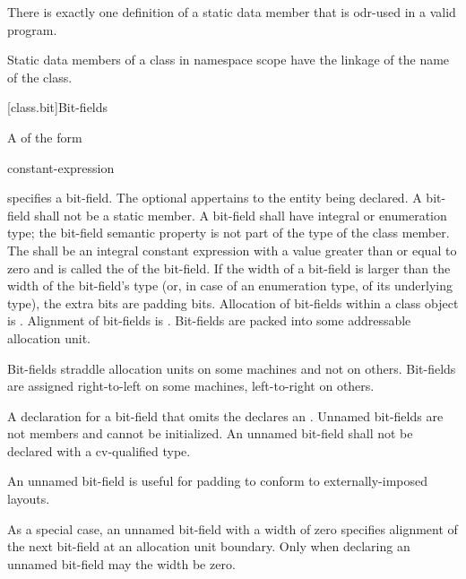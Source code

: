 \pnum
\begin{note}
There is exactly one definition of a static data member
that is odr-used in a valid program.
\end{note}

\pnum
\begin{note}
Static data members of a class in namespace scope have the linkage of the name of the class.
\end{note}

[class.bit]{Bit-fields}%

\pnum
A  of the form
\begin{ncsimplebnf}
  \terminal{:} constant-expression 
\end{ncsimplebnf}
%
%
specifies a bit-field.
The optional  appertains
to the entity being declared.
A bit-field shall not be a static member.
%
A bit-field shall have integral or enumeration type;
the bit-field semantic property is not part of the type of the class member.
The  shall be an integral constant expression
with a value greater than or equal to zero and
is called the  of the bit-field.
If the width of a bit-field is larger than
the width of the bit-field's type
(or, in case of an enumeration type, of its underlying type),
the extra bits are padding bits.
%
Allocation of bit-fields within a class object is
.
%
Alignment of bit-fields is .
%
Bit-fields are packed into some addressable allocation unit.
\begin{note}
Bit-fields straddle allocation units on some machines and not on others.
Bit-fields are assigned right-to-left on some machines, left-to-right on
others.
\end{note}

\pnum
A declaration for a bit-field that omits the 
declares an . Unnamed bit-fields are not
members and cannot be initialized.
An unnamed bit-field shall not be declared with a cv-qualified type.
\begin{note}
An unnamed bit-field is useful for padding to conform to
externally-imposed layouts.
\end{note}
%
%
As a special case, an unnamed bit-field with a width of zero specifies
alignment of the next bit-field at an allocation unit boundary. Only
when declaring an unnamed bit-field may the width be zero.

